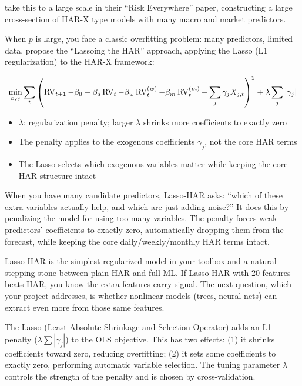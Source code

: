 \citet{BollerslevEtAl2018} take this to a large scale in their ``Risk Everywhere'' paper, constructing a large cross-section of HAR-X type models with many macro and market predictors.

When $p$ is large, you face a classic overfitting problem: many predictors, limited data.
\citet{AudrinoKnaus2016} propose the ``Lassoing the HAR'' approach, applying the Lasso (L1 regularization) to the HAR-X framework:

\begin{equation}
  \min_{\beta, \gamma} \sum_{t} \left(\operatorname{RV}_{t+1} - \beta_0 - \beta_d \operatorname{RV}_t - \beta_w \operatorname{RV}^{(w)}_t - \beta_m \operatorname{RV}^{(m)}_t - \sum_j \gamma_j X_{j,t}\right)^2 + \lambda \sum_j |\gamma_j|
  \label{eq:lasso-har}
\end{equation}
\begin{itemize}[nosep]
  \item $\lambda$: regularization penalty; larger $\lambda$ shrinks more coefficients to exactly zero
  \item The penalty applies to the exogenous coefficients $\gamma_j$, not the core HAR terms
  \item The Lasso selects which exogenous variables matter while keeping the core HAR structure intact
\end{itemize}

\begin{intuition}
When you have many candidate predictors, Lasso-HAR asks: ``which of these extra variables actually help, and which are just adding noise?''
It does this by penalizing the model for using too many variables.
The penalty forces weak predictors' coefficients to exactly zero, automatically dropping them from the forecast, while keeping the core daily/weekly/monthly HAR terms intact.
\end{intuition}

\begin{projectconnection}
Lasso-HAR is the simplest regularized model in your toolbox and a natural stepping stone between plain HAR and full ML.
If Lasso-HAR with 20 features beats HAR, you know the extra features carry signal.
The next question, which your project addresses, is whether nonlinear models (trees, neural nets) can extract even more from those same features.
\end{projectconnection}

\begin{prereq}
The Lasso (Least Absolute Shrinkage and Selection Operator) adds an L1 penalty ($\lambda \sum |\gamma_j|$) to the OLS objective.
This has two effects: (1) it shrinks coefficients toward zero, reducing overfitting; (2) it sets some coefficients to exactly zero, performing automatic variable selection.
The tuning parameter $\lambda$ controls the strength of the penalty and is chosen by cross-validation.
\end{prereq}

